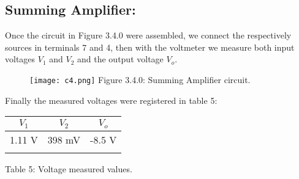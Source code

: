 \subsection{Summing Amplifier:}

Once the circuit in Figure 3.4.0 were assembled, we connect the respectively sources in terminals 7 and 4, then with the voltmeter we measure both input voltages $V_{1}$ and $V_{2}$ and the output voltage $V_{o}$. \hfill \break

\begin{figure}[H]
\texttt{[image: c4.png]}
\centering \linebreak \linebreak Figure 3.4.0: Summing Amplifier circuit.
\end{figure} \hfill

Finally the measured voltages were registered in table 5: \hfill \break

\begin{center}
\begin{tabular}[.5cm]{c c c}
\toprule
\toprule
\hspace{60pt} $V_{1}$ \hspace{60pt} & \hspace{60pt} $V_{2}$ \hspace{60pt} & \hspace{60pt} $V_{o}$ \hspace{60pt}  \\
\midrule
\midrule
1.11 V & 398 mV & -8.5 V \\
\bottomrule
\linebreak
\end{tabular}
\linebreak Table 5: Voltage measured values.
\end{center} \hfill